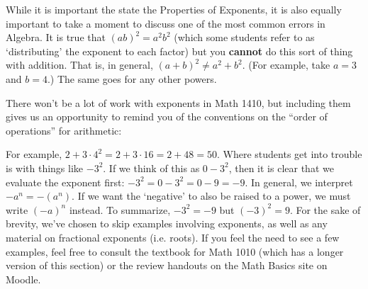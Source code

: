 While it is important the state the Properties of Exponents, it is also equally important to take a moment to discuss one of the most common errors in Algebra.  It is true that $(ab)^2 = a^2 b^2$ (which some students refer to as `distributing' the exponent to each factor) but you {\bf cannot} do this sort of thing with addition.  That is, in general,   $(a+b)^2 \neq a^2 + b^2$. (For example, take $a= 3$ and $b = 4$.)  The same goes for any other powers.

\smallskip

There won't be a lot of work with exponents in Math 1410,  but including them gives us an opportunity to remind you of the conventions on the ``order of operations'' for arithmetic:

\medskip



\medskip

For example, $2 + 3\cdot 4^2 = 2 + 3\cdot 16 = 2 + 48 = 50$.  Where students get into trouble is with things like $-3^2$.  If we think of this as $0 - 3^2$, then it is clear that we evaluate the exponent first:  $-3^2 =0 -3^2 =0 -9 = -9$.  In general, we interpret $-a^n = -\left(a^n\right)$.  If we want the `negative' to also be raised to a power, we must  write $(-a)^n$ instead.  To summarize, $-3^2 = -9$ but $(-3)^2  = 9$. For the sake of brevity, we've chosen to skip examples involving exponents, as well as any material on fractional exponents (i.e. roots). If you feel the need to see a few examples, feel free to consult the textbook for Math 1010 (which has a longer version of this section) or the review handouts on the Math Basics site on Moodle.


